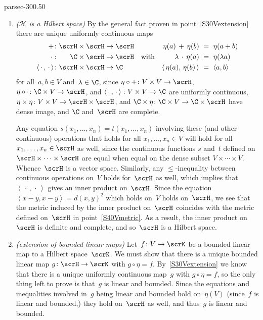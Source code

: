 \documentclass[b5page]{book}
\begin{document}
\begin{solution}{parsec-300.50}
\begin{enumerate}
\item
\emph{($\mathscr{H}$ is a Hilbert space)}
By the general fact proven in point~\ref{S30Vextension} 
there are unique uniformly continuous maps
\begin{equation}
\label{S30VHops}
\begin{alignedat}{3}
+ &\colon &\scrH&\times \scrH\to \scrH\\
\,\cdot\, &\colon &\C&\times\scrH\to \scrH\\
\left<\,\cdot\,,\,\cdot\,\right>&\colon
&\scrH&\times\scrH\to \C
\end{alignedat}
\quad\text{with}\quad
\begin{alignedat}{3}
\eta(a)\,+\,\eta(b)\ &=\ \eta(a+b)\\
\lambda\,\cdot\,\eta(a)\ &=\ \eta(\lambda a) \\
\left<\,\eta(a),\,\eta(b)\,\right>\ &=\ \left<a,b\right>
\end{alignedat}
\end{equation}
for all~$a,b\in V$ and~$\lambda\in \C$,
since
$\eta\circ +\colon V\times V\to \scrH$,
$\eta\circ \cdot \colon \C\times V\to \scrH$,
and $\left<\,\cdot\,,\,\cdot\,\right>\colon V\times V\to \C$
are uniformly continuous, 
$\eta\times \eta\colon V\times V \to \scrH\times\scrH$, and
$\C\times \eta\colon \C\times V\to \C\times \scrH$
have dense image,
and $\C$ and~$\scrH$ are complete.

Any equation  $s(x_1,\dotsc,x_n)=t(x_1,\dotsc,x_n)$
involving these (and other continuous) operations
that holds for all $x_1,\dotsc,x_n\in V$
will hold for all $x_1,\dotsc,x_n\in \scrH$
as well,
since the continuous functions $s$ and~$t$
defined on $\scrH\times\dotsb \times\scrH$
are equal when equal
on the dense subset $V\times\dotsb\times V$.
Whence~$\scrH$ is a vector space.
Similarly,
any $\leq$-inequality between continuous operations
on~$V$ holds for~$\scrH$ as well,
which implies that~$\left<\,\cdot\,,\,\cdot\,\right>$
gives an inner product on~$\scrH$.
Since the equation $\left<x-y,x-y\right>=d(x,y)^2$
which holds on~$V$ holds on~$\scrH$,
we see that the metric induced by the inner product on~$\scrH$
coincides with the metric defined on~$\scrH$ in point~\ref{S40Vmetric}.
As a result, the inner product on~$\scrH$
is definite and complete,
and so~$\scrH$ is a Hilbert space.
\item
\emph{(extension of bounded linear maps)}
Let~$f\colon V\to\scrK$ be a bounded linear map
to a Hilbert space~$\scrK$.
We must show that there is a unique bounded linear map
$g\colon \scrH\to \scrK$ with $g\circ \eta = f$.
By~\ref{S30Vextension}
we know that there is a unique uniformly continuous map~$g$
with $g\circ \eta=f$,
so the only thing left to prove is that~$g$
is linear and bounded.
Since the equations and inequalities involved in~$g$ being linear
and bounded hold on~$\eta(V)$
(since~$f$ is linear and bounded,)
they hold on~$\scrH$ as well,
and thus~$g$ is linear and bounded.
\end{enumerate}
\end{solution}
\end{document}
